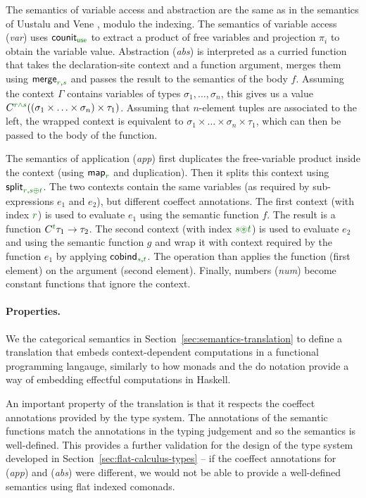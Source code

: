 The semantics of variable access and abstraction are the same as in the semantics of Uustalu and 
Vene \cite{comonads-notions}, modulo the indexing. The semantics of variable access (\emph{var}) uses 
$\ident{counit}_{\cunit}$ to extract a product of free variables and projection
$\pi_i$ to obtain the variable value. Abstraction (\emph{abs}) is interpreted as a curried
function that takes the declaration-site context and a function argument, merges them using
$\ident{merge}_{\cclrd{r}, \cclrd{s}}$ and passes the result to the semantics of the body $f$. 
Assuming the context $\Gamma$ contains variables of types $\sigma_1, \ldots, \sigma_n$, this gives 
us a value $\ctyp{\cclrd{r}\czip\cclrd{s}}((\sigma_1 \times \ldots \times \sigma_n) \times \tau_1)$.
Assuming that $n$-element tuples are associated to the left, the wrapped context is equivalent to
$\sigma_1 \times \ldots \times \sigma_n \times \tau_1$, which can then be passed to the body of the
function.

The semantics of application (\emph{app}) first duplicates the free-variable product inside the 
context (using $\ident{map}_{\cclrd{r}}$ and duplication). Then it splits this context using 
$\ident{split}_{\cclrd{r}, \cclrd{s} \cpar \cclrd{t}}$. The two contexts contain the same variables
(as required by sub-expressions $e_1$ and $e_2$), but different coeffect annotations. The first
context (with index $\cclrd{r}$) is used to evaluate $e_1$ using the semantic function $f$. The 
result is a function $\ctyp{\cclrd{t}}{\tau_1} \rightarrow \tau_2$. The second context
(with index $\cclrd{s}\cseq\cclrd{t}$) is used to evaluate $e_2$ and using the semantic function $g$
and wrap it with context required by the function $e_1$ by applying $\ident{cobind}_{\cclrd{s}, \cclrd{t}}$.
The  operation than applies the function (first element) on the argument (second element).
Finally, numbers (\emph{num}) become constant functions that ignore the context.

\paragraph{Properties.}
We the categorical semantics  in Section~\ref{sec:semantics-translation} to define a translation 
that embeds context-dependent computations in a functional programming langauge, similarly to how 
monads and the do notation provide a way of embedding effectful computations in Haskell.

An important property of the translation is that it respects the coeffect annotations provided 
by the type system. The annotations of the semantic functions match the annotations in the typing
judgement and so the semantics is well-defined. 
This provides a further validation for the design of the type system developed in 
Section~\ref{sec:flat-calculus-types} -- if the coeffect annotations for (\emph{app}) and (\emph{abs}) 
were different, we would not be able to provide a well-defined semantics using flat indexed comonads.

